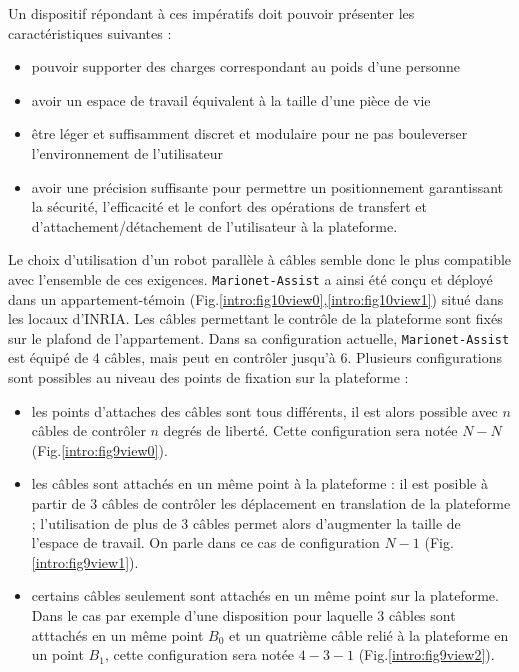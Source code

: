Un dispositif répondant à ces impératifs doit pouvoir présenter les caractéristiques suivantes :
\begin{itemize}
 \item pouvoir supporter des charges correspondant au poids d'une personne
 \item avoir un espace de travail équivalent à la taille d'une pièce de vie
 \item être léger et suffisamment discret et modulaire pour ne pas bouleverser l'environnement de l'utilisateur
 \item avoir une précision suffisante pour permettre un positionnement garantissant la sécurité, l'efficacité et le confort des opérations de transfert et d'attachement/détachement de l'utilisateur à la plateforme.
\end{itemize}

Le choix d'utilisation d'un robot parallèle à câbles semble donc le plus compatible avec l'ensemble de ces exigences. {\tt Marionet-Assist} a ainsi été conçu et déployé dans un appartement-témoin (Fig.\ref{intro:fig10view0},\ref{intro:fig10view1}) situé dans les locaux d'INRIA. Les câbles permettant le contrôle de la plateforme sont fixés sur le plafond de l'appartement. Dans sa configuration actuelle, {\tt Marionet-Assist} est équipé de $4$ câbles, mais peut en contrôler jusqu'à $6$. Plusieurs configurations sont possibles au niveau des points de fixation sur la plateforme :
\begin{itemize}
 \item les points d'attaches des câbles sont tous différents, il est alors possible avec $n$ câbles de contrôler $n$ degrés de liberté. Cette configuration sera notée $N-N$ (Fig.\ref{intro:fig9view0}).
 \item les câbles sont attachés en un même point à la plateforme : il est posible à partir de $3$ câbles de contrôler les déplacement en translation de la plateforme ; l'utilisation de plus de $3$ câbles permet alors d'augmenter la taille de l'espace de travail. On parle dans ce cas de configuration $N-1$ (Fig.\ref{intro:fig9view1}).
 \item certains câbles seulement sont attachés en un même point sur la plateforme. Dans le cas par exemple d'une disposition pour laquelle $3$ câbles sont atttachés en un même point $B_0$ et un quatrième câble relié à la plateforme en un point $B_1$, cette configuration sera notée $4-3-1$ (Fig.\ref{intro:fig9view2}).
\end{itemize}

